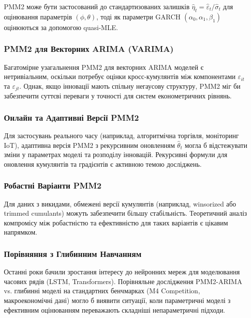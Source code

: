 \documentclass[12pt,a4paper]{article}
\begin{document}
PMM2 може бути застосований до стандартизованих залишків $\hat{\eta}_t = \hat{\varepsilon}_t / \hat{\sigma}_t$ для оцінювання параметрів $(\phi, \theta)$, тоді як параметри GARCH $(\alpha_0, \alpha_1, \beta_1)$ оцінюються за допомогою quasi-MLE.

\subsubsection{PMM2 для Векторних ARIMA (VARIMA)}

Багатомірне узагальнення PMM2 для векторних ARIMA моделей є нетривіальним, оскільки потребує оцінки кросс-кумулянтів між компонентами $\varepsilon_{it}$ та $\varepsilon_{jt}$. Однак, якщо інновації мають спільну негаусову структуру, PMM2 міг би забезпечити суттєві переваги у точності для систем економетричних рівнянь.

\subsubsection{Онлайн та Адаптивні Версії PMM2}

Для застосувань реального часу (наприклад, алгоритмічна торгівля, моніторинг IoT), адаптивна версія PMM2 з рекурсивним оновленням $\hat{\theta}_t$ могла б відстежувати зміни у параметрах моделі та розподілу інновацій. Рекурсивні формули для оновлення кумулянтів та градієнтів є активною темою досліджень.

\subsubsection{Робастні Варіанти PMM2}

Для даних з викидами, обмежені версії кумулянтів (наприклад, winsorized або trimmed cumulants) можуть забезпечити більшу стабільність. Теоретичний аналіз компромісу між робастністю та ефективністю для таких варіантів є цікавим напрямком.

\subsubsection{Порівняння з Глибинним Навчанням}

Останні роки бачили зростання інтересу до нейронних мереж для моделювання часових рядів (LSTM, Transformers). Порівняльне дослідження PMM2-ARIMA vs. глибинні моделі на стандартних бенчмарках (M4 Competition, макроекономічні дані) могло б виявити ситуації, коли параметричні моделі з ефективним оцінюванням переважають складніші непараметричні підходи.
\end{document}
